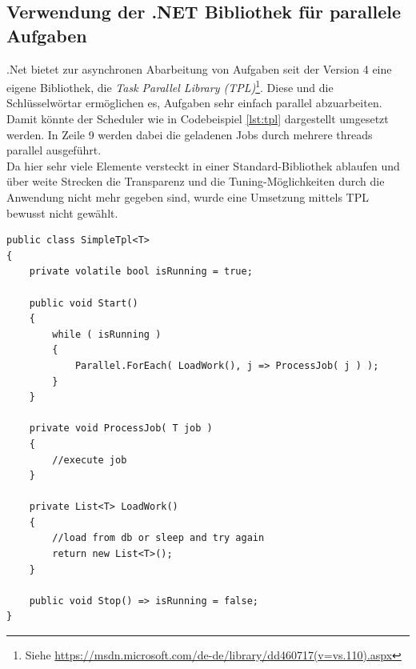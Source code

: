 \subsection{Verwendung der .NET Bibliothek für parallele Aufgaben}
.Net bietet zur asynchronen Abarbeitung von Aufgaben seit der Version 4 eine eigene Bibliothek, die \emph{Task Parallel Library (TPL)}\footnote{Siehe \url{https://msdn.microsoft.com/de-de/library/dd460717(v=vs.110).aspx}}. Diese und die Schlüsselwörtar  ermöglichen es, Aufgaben sehr einfach parallel abzuarbeiten. Damit könnte der Scheduler wie in Codebeispiel \ref{lst:tpl} dargestellt umgesetzt werden. In Zeile 9 werden dabei die geladenen Jobs durch mehrere threads parallel  ausgeführt.
\\Da hier sehr viele Elemente versteckt in einer Standard-Bibliothek ablaufen und über weite Strecken die Transparenz und die Tuning-Möglichkeiten durch die Anwendung nicht mehr gegeben sind, wurde eine Umsetzung mittels TPL bewusst nicht gewählt.

\begin{lstlisting}[caption={JobScheduler, einfache TPL Implementierung, siehe SimpleTpl.cs}, label={lst:tpl}, captionpos=b]
public class SimpleTpl<T>
{
	private volatile bool isRunning = true;
	
	public void Start()
	{
		while ( isRunning )
		{
			Parallel.ForEach( LoadWork(), j => ProcessJob( j ) );
		}
	}
	
	private void ProcessJob( T job )
	{
		//execute job
	}
	
	private List<T> LoadWork()
	{
		//load from db or sleep and try again
		return new List<T>();
	}
	
	public void Stop() => isRunning = false;
}
\end{lstlisting}
\chapterend
